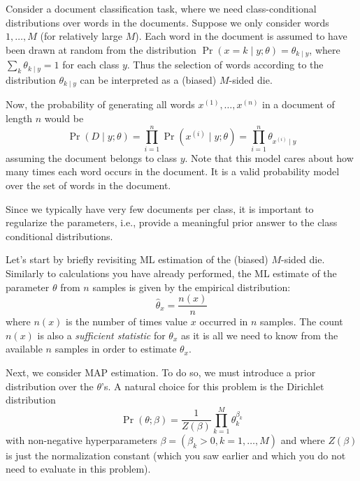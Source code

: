 \documentclass[11pt]{exam}
\begin{document}
Consider a document classification task, where we need
class-conditional distributions over words in the documents. Suppose
we only consider words $1, \ldots , M$ (for relatively large $M$). Each
word in the document is assumed to have been drawn at random from the
distribution $\Pr(x = k \mid y; \theta) = \theta_{k \mid y}$, where
$\sum_k \theta_{k\mid y} = 1$ for each class $y$. Thus the selection
of words according to the distribution $\theta_{k \mid y}$ can 
be interpreted as a (biased) $M$-sided die. 

Now, the probability of generating all words $x^{(1)}, \dots , x^{(n)}$ in a
document of length $n$ would be 
\[\Pr(D \mid y; \theta) = \prod_{i=1}^n \Pr(x^{(i)} \mid y; \theta) =
\prod_{i=1}^n \theta_{x^{(i)} \mid y}\]
assuming the document belongs to class $y$. Note that this model cares
about how many times each word occurs in the document. It is a valid
probability model over the set of words in the document. 

Since we typically have very few documents per class, it is important
to regularize the parameters, i.e., provide a meaningful prior answer
to the class conditional distributions. 

Let's start by briefly revisiting ML estimation of the (biased)
$M$-sided die. Similarly to calculations you have already performed, the
ML estimate of the parameter $\theta$ from $n$ samples is given by the
empirical distribution: 
\[\hat{\theta}_x = \frac{n(x)}{n} \]
where $n(x)$ is the number of times value $x$ occurred in $n$
samples. The count $n(x)$ is also a {\it sufficient statistic} for
$\theta_x$ as it is all we need to know  from the available $n$ samples
in order to estimate $\theta_x$.  

Next, we consider MAP estimation. To do so, we must introduce a prior
distribution over the $\theta$'s. A natural choice for this problem is the
Dirichlet distribution
\[ \Pr(\theta; \beta) = \frac{1}{Z(\beta)}\prod_{k=1}^M
\theta_k^{\beta_k}\] with non-negative hyperparameters $\beta =
(\beta_k > 0, k = 1, \ldots , M)$ and where $Z(\beta)$ is just the
normalization constant (which you saw earlier and which you do not
need to evaluate in this problem).
\end{document}
